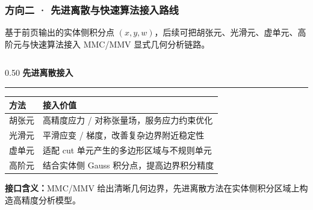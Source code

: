 \documentclass[notheorems]{beamer}
\newcommand{\accentintro}[1]{%
	\noindent{\color{structure.fg}\rule[-2pt]{3pt}{12pt}}\hspace{7pt}%
	\begin{minipage}[t]{\dimexpr\linewidth-13pt\relax}%
		\fontsize{8}{11.5}\selectfont\sffamily #1\end{minipage}\par}
\newcommand{\imglabel}[1]{%
	{\fontsize{8}{10}\selectfont\sffamily\bfseries\color{structure.fg}#1}\par\vspace{2pt}}
\begin{document}
	\begin{frame}
		\frametitle{方向二 · 先进离散与快速算法接入路线}

		\accentintro{基于前页输出的实体侧积分点 $(x,y,w)$，后续可把胡张元、光滑元、虚单元、高阶元与快速算法接入 MMC/MMV 显式几何分析链路。}

		\vspace{0.70em}
		\begin{columns}[T, totalwidth=\linewidth]
			\begin{column}{0.50\linewidth}
				\vspace{0pt}
				\imglabel{先进离散接入}
				\vspace{-0.75em}
				{\color{structure.fg!35}\rule{\linewidth}{0.7pt}}\vspace{0.36em}
				{\fontsize{6.35}{8.25}\selectfont\sffamily
				\begin{tabular}{@{}p{1.18cm}p{4.30cm}@{}}
					\hline
					\textcolor{structure.fg}{方法} & \textcolor{structure.fg}{接入价值}\\
					\hline
					胡张元 & 高精度应力 / 对称张量场，服务应力约束优化\\
					光滑元 & 平滑应变 / 梯度，改善复杂边界附近稳定性\\
					虚单元 & 适配 cut 单元产生的多边形区域与不规则单元\\
					高阶元 & 结合实体侧 Gauss 积分点，提高边界积分精度\\
					\hline
				\end{tabular}}

				\vspace{0.32em}
				{\fontsize{6.35}{8.55}\selectfont\sffamily
					\textbf{\color{structure.fg}接口含义：}MMC/MMV 给出清晰几何边界，先进离散方法在实体侧积分区域上构造高精度分析模型。}
			\end{column}


\end{columns}
\end{frame}
\end{document}
